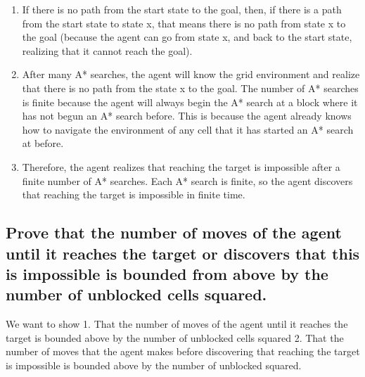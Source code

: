 \documentclass{article}
\begin{document}
\begin{enumerate}
	\item If there is no path from the start state to the goal, then, if there is a path from the start state to state x, that means there is no path from state x to the goal (because the agent can go from state x, and back to the start state, realizing that it cannot reach the goal).
	\item After many A* searches, the agent will know the grid environment and realize that there is no path from the state x to the goal. The number of A* searches is finite because the agent will always begin the A* search at a block where it has not begun an A* search before. This is because the agent already knows how to navigate the environment of any cell that it has started an A* search at before.
	\item Therefore, the agent realizes that reaching the target is impossible after a finite number of A* searches. Each A* search is finite, so the agent discovers that reaching the target is impossible in finite time.
\end{enumerate}

\subsection{Prove that the number of moves of the agent until it reaches the target or discovers that this is impossible is bounded from above by the number of unblocked cells squared.}

We want to show 1. That the number of moves of the agent until it reaches the target is bounded above by the number of unblocked cells squared  2. That the number of moves that the agent makes before discovering that reaching the target is impossible is bounded above by the number of unblocked squared.\\
\end{document}
